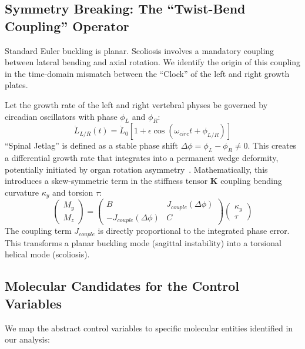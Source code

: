\subsection{Symmetry Breaking: The ``Twist-Bend Coupling'' Operator}

Standard Euler buckling is planar. Scoliosis involves a mandatory coupling between lateral bending and axial rotation. We identify the origin of this coupling in the time-domain mismatch between the ``Clock'' of the left and right growth plates.

Let the growth rate of the left and right vertebral physes be governed by circadian oscillators with phase $\phi_L$ and $\phi_R$:
\begin{equation}
\dot{L}_{L/R}(t) = \dot{L}_0 [ 1 + \epsilon \cos(\omega_{circ} t + \phi_{L/R}) ]
\end{equation}
``Spinal Jetlag'' is defined as a stable phase shift $\Delta \phi = \phi_L - \phi_R \neq 0$. This creates a differential growth rate that integrates into a permanent wedge deformity, potentially initiated by organ rotation asymmetry~\cite{kouwenhoven2006organ}.
Mathematically, this introduces a skew-symmetric term in the stiffness tensor $\mathbf{K}$ coupling bending curvature $\kappa_y$ and torsion $\tau$:
\begin{equation}
\begin{pmatrix} M_y \\ M_z \end{pmatrix} = \begin{pmatrix} B & J_{couple}(\Delta \phi) \\ -J_{couple}(\Delta \phi) & C \end{pmatrix} \begin{pmatrix} \kappa_y \\ \tau \end{pmatrix}
\end{equation}
The coupling term $J_{couple}$ is directly proportional to the integrated phase error. This transforms a planar buckling mode (sagittal instability) into a torsional helical mode (scoliosis).

\subsection{Molecular Candidates for the Control Variables}

We map the abstract control variables to specific molecular entities identified in our analysis:

